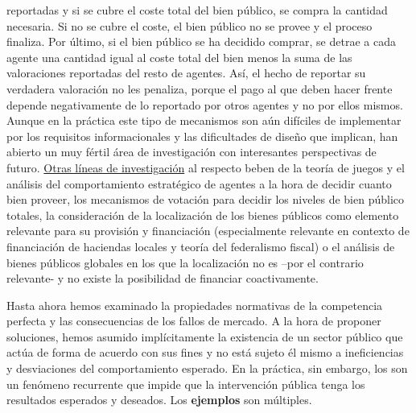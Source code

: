 \documentclass{nuevotema}
\begin{document}
reportadas y si se cubre el coste total del bien público, se compra la cantidad necesaria. Si no se cubre el coste, el bien público no se provee y el proceso finaliza. Por último, si el bien público se ha decidido comprar, se detrae a cada agente una cantidad igual al coste total del bien menos la suma de las valoraciones reportadas del resto de agentes. Así, el hecho de reportar su verdadera valoración no les penaliza, porque el pago al que deben hacer frente depende negativamente de lo reportado por otros agentes y no por ellos mismos. Aunque en la práctica este tipo de mecanismos son aún difíciles de implementar por los requisitos informacionales y las dificultades de diseño que implican, han abierto un muy fértil área de investigación con interesantes perspectivas de futuro. \underline{Otras líneas de investigación} al respecto beben de la teoría de juegos y el análisis del comportamiento estratégico de agentes a la hora de decidir cuanto bien proveer, los mecanismos de votación para decidir los niveles de bien público totales, la consideración de la localización de los bienes públicos como elemento relevante para su provisión y financiación (especialmente relevante en contexto de financiación de haciendas locales y teoría del federalismo fiscal) o el análisis de bienes públicos globales en los que la localización no es --por el contrario relevante- y no existe la posibilidad de financiar coactivamente.

Hasta ahora hemos examinado la propiedades normativas de la competencia perfecta y las consecuencias de los fallos de mercado. A la hora de proponer soluciones, hemos asumido implícitamente la existencia de un sector público que actúa de forma de acuerdo con sus fines y no está sujeto él mismo a ineficiencias y desviaciones del comportamiento esperado. En la práctica, sin embargo, los  son un fenómeno recurrente que impide que la intervención pública tenga los resultados esperados y deseados. Los \textbf{ejemplos} son múltiples. 
\end{document}
